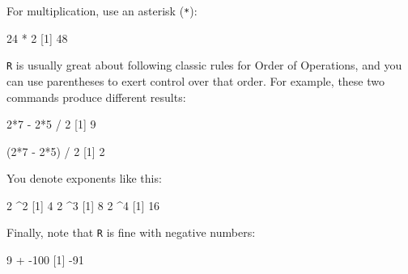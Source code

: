 \documentclass[
]{book}
\newenvironment{Shaded}{\begin{snugshade}}{\end{snugshade}}
\newcommand{\DecValTok}[1]{\textcolor[rgb]{0.00,0.00,0.81}{#1}}
\newcommand{\NormalTok}[1]{#1}
\newcommand{\SpecialCharTok}[1]{\textcolor[rgb]{0.00,0.00,0.00}{#1}}
\begin{document}
For multiplication, use an asterisk (\texttt{*}):

\begin{Shaded}
\begin{Highlighting}[]
\DecValTok{24} \SpecialCharTok{*} \DecValTok{2}
\NormalTok{[}\DecValTok{1}\NormalTok{] }\DecValTok{48}
\end{Highlighting}
\end{Shaded}

\texttt{R} is usually great about following classic rules for Order of Operations, and you can use parentheses to exert control over that order. For example, these two commands produce different results:

\begin{Shaded}
\begin{Highlighting}[]
\DecValTok{2}\SpecialCharTok{*}\DecValTok{7} \SpecialCharTok{{-}} \DecValTok{2}\SpecialCharTok{*}\DecValTok{5} \SpecialCharTok{/} \DecValTok{2}
\NormalTok{[}\DecValTok{1}\NormalTok{] }\DecValTok{9}

\NormalTok{(}\DecValTok{2}\SpecialCharTok{*}\DecValTok{7} \SpecialCharTok{{-}} \DecValTok{2}\SpecialCharTok{*}\DecValTok{5}\NormalTok{) }\SpecialCharTok{/} \DecValTok{2}
\NormalTok{[}\DecValTok{1}\NormalTok{] }\DecValTok{2}
\end{Highlighting}
\end{Shaded}

You denote exponents like this:

\begin{Shaded}
\begin{Highlighting}[]
\DecValTok{2} \SpecialCharTok{\^{}}\DecValTok{2}
\NormalTok{[}\DecValTok{1}\NormalTok{] }\DecValTok{4}
\DecValTok{2} \SpecialCharTok{\^{}}\DecValTok{3}
\NormalTok{[}\DecValTok{1}\NormalTok{] }\DecValTok{8}
\DecValTok{2} \SpecialCharTok{\^{}}\DecValTok{4}
\NormalTok{[}\DecValTok{1}\NormalTok{] }\DecValTok{16}
\end{Highlighting}
\end{Shaded}

Finally, note that \texttt{R} is fine with negative numbers:

\begin{Shaded}
\begin{Highlighting}[]
\DecValTok{9} \SpecialCharTok{+} \SpecialCharTok{{-}}\DecValTok{100}
\NormalTok{[}\DecValTok{1}\NormalTok{] }\SpecialCharTok{{-}}\DecValTok{91}
\end{Highlighting}
\end{Shaded}
\end{document}
